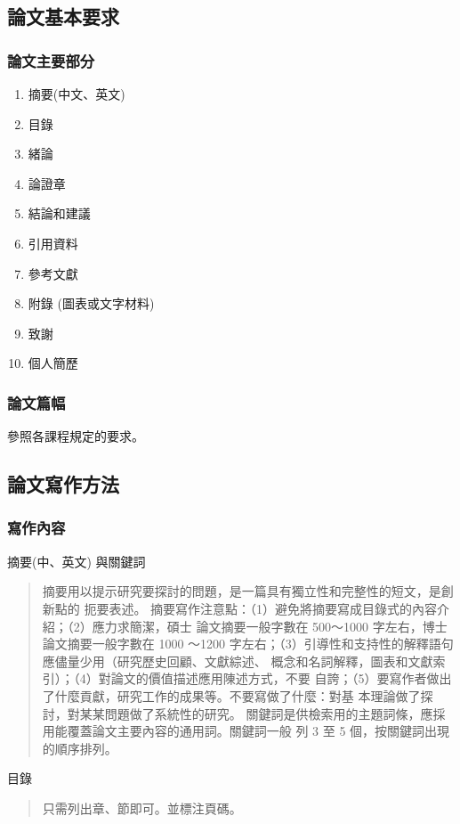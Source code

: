 \documentclass[
    writingLanguage=chinese, %
    addPageTitle=on,  %
    addDeclaration=on, %
    addMUSTlog=on, %
    addFigTOC=on, %
    addTabTOC=on, %
    refIndent=off, %
    printMod=off, %
]{must}
\begin{document}
\subsection{論文基本要求}
\subsubsection{論文主要部分}

\begin{enumerate}
    \item 摘要(中文、英文)
    \item 目錄
    \item 緒論
    \item 論證章
    \item 結論和建議
    \item 引用資料
    \item 參考文獻
    \item 附錄 (圖表或文字材料)
    \item 致謝
    \item 個人簡歷
\end{enumerate}

\subsubsection{論文篇幅}
參照各課程規定的要求。

\subsection{論文寫作方法}
\subsubsection{寫作內容}
\noindent\faHandORight 摘要(中、英文) 與關鍵詞
\begin{quote}
摘要用以提示研究要探討的問題，是一篇具有獨立性和完整性的短文，是創新點的
扼要表述。
摘要寫作注意點：（1）避免將摘要寫成目錄式的內容介紹；（2）應力求簡潔，碩士
論文摘要一般字數在 500～1000 字左右，博士論文摘要一般字數在 1000 ～1200
字左右；（3）引導性和支持性的解釋語句應儘量少用（研究歷史回顧、文獻綜述、
概念和名詞解釋，圖表和文獻索引）；（4）對論文的價值描述應用陳述方式，不要
自誇；（5）要寫作者做出了什麼貢獻，研究工作的成果等。不要寫做了什麼：對基
本理論做了探討，對某某問題做了系統性的研究。
關鍵詞是供檢索用的主題詞條，應採用能覆蓋論文主要內容的通用詞。關鍵詞一般
列 3 至 5 個，按關鍵詞出現的順序排列。
\end{quote}


\noindent\faHandORight 目錄
\begin{quote}
 只需列出章、節即可。並標注頁碼。
    
\end{quote}
\end{document}
